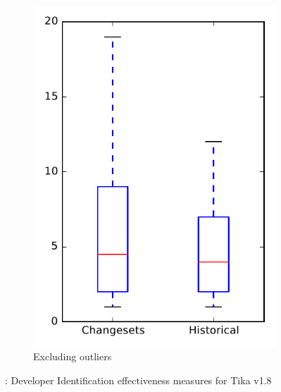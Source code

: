 \begin{figure}
\begin{subfigure}{.4\textwidth}
        \includegraphics[height=0.4\textheight]{figures/dit/rq2_tika_no_outlier}
        \caption{Excluding outliers}\label{fig:dit:rq2:tika_no_outlier}
    \end{subfigure}
\caption{\dtwo: Developer Identification effectiveness measures for Tika v1.8}
\label{fig:dit:rq2:tika}
\end{figure}
